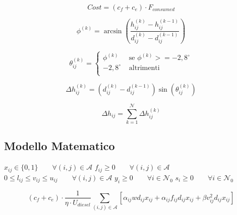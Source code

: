 \documentclass{article}
\begin{document}
			\begin{equation}
				\label{eq:overall_cost}
				Cost = (c_f + c_e) \cdot F_{consumed}
			\end{equation}

			\begin{equation}
				\label{eq:angle_calculation}
				\phi^{(k)} = \arcsin \left(
					\frac{h_{ij}^{(k)} - h_{ij}^{(k-1)}}
						{d_{ij}^{(k)} - d_{ij}^{(k-1)}}
					\right)
			\end{equation}

			\begin{equation}
				\label{eq:slope_assignment}
				\theta_{ij}^{(k)} = 
					\begin{cases}
						\phi^{(k)}	&	\text{ se } \phi^{(k)} >= -2,8^\circ \\
						-2,8^\circ	&	\text{ altrimenti } \\
					\end{cases}
			\end{equation}

			\begin{equation}
				\label{eq:fake_quote_diff_partial}
				\Delta h_{ij}^{(k)} = (d_{ij}^{(k)} - d_{ij}^{(k-1)}) \sin(\theta_{ij}^{(k)})
			\end{equation}

			\begin{equation}
				\label{eq:fake_quote_diff}
				\Delta h_{ij} = \sum_{k = 1}^{\mathcal{N}} \Delta h_{ij}^{(k)}
			\end{equation}

		\subsection{Modello Matematico} %
		\label{sub:modello_matematico}

			$x_{ij} \in \{0,1\} \qquad \forall (i,j) \in \mathcal{A}$
			$f_{ij} \geq 0 \qquad \forall (i,j) \in \mathcal{A}$
			$0 \leq l_{ij} \leq v_{ij} \leq u_{ij} \qquad \forall (i,j) \in \mathcal{A}$
			$y_i \geq 0 \qquad \forall i \in \mathcal{N}_0$
			$s_i \geq 0 \qquad \forall i \in \mathcal{N}_0$

			\begin{equation}
				\label{eq:fuel_emission_cost}
				 (c_f + c_e) \cdot 
				 \frac{1}{\eta \cdot U_{diesel}} 
				 \sum_{(i,j) \in \mathcal{A}} \left[
				 	\alpha_{ij}wd_{ij}x_{ij} + 
				 	\alpha_{ij}f_{ij}d_{ij}x_{ij} + 
				 	\beta v_{ij}^2 d_{ij} x_{ij}
				 \right]
			\end{equation}
\end{document}
